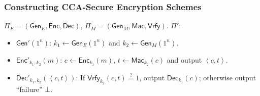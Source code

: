 \begin{frame}\frametitle{Constructing CCA-Secure Encryption Schemes}
\begin{figure}
\begin{center}

\end{center}
\end{figure}
\begin{construction}
$\Pi_E = (\mathsf{Gen}_E, \mathsf{Enc}, \mathsf{Dec})$, $\Pi_M = (\mathsf{Gen}_M, \mathsf{Mac}, \mathsf{Vrfy})$. $\Pi'$:
\begin{itemize}
\item $\mathsf{Gen}'(1^n)$: $k_1 \gets \mathsf{Gen}_E(1^n)$ and $k_2 \gets \mathsf{Gen}_M(1^n)$.
\item $\mathsf{Enc}'_{k_1,k_2}(m)$: $c \gets \mathsf{Enc}_{k_1}(m)$, $t \gets \mathsf{Mac}_{k_2}(c)$ and output $\left< c,t \right>$.
\item $\mathsf{Dec}'_{k_1,k_2}(\left< c,t \right>)$: If $\mathsf{Vrfy}_{k_2}(c,t) \overset{?}{=} 1$, output $\mathsf{Dec}_{k_1}(c)$; otherwise output ``failure'' $\bot$.
\end{itemize}
\end{construction}
\end{frame}
